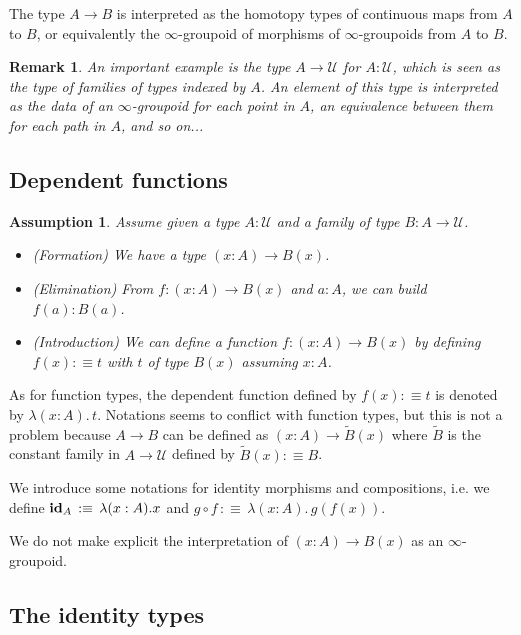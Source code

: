 \documentclass{article}
\newcommand{\sse}[1]{\medbreak \subsection{#1}}
\newcommand{\U}{{\mathcal U}}
\renewcommand{\r}{\rightarrow}
\newcommand{\Gl}{\lambda}
\newcommand{\id}{\mathrm{\bf id}}
\newtheorem{remark}{Remark}
\newtheorem{assumption}{Assumption}
\begin{document}
The type $A\r B$ is interpreted as the homotopy types of continuous maps from $A$ to $B$, or equivalently the $\infty$-groupoid of morphisms of $\infty$-groupoids from $A$ to $B$.

\begin{remark}
An important example is the type $A\r \U$ for $A:\U$, which is seen as the type of families of types indexed by $A$. An element of this type is interpreted as the data of an $\infty$-groupoid for each point in $A$, an equivalence between them for each path in $A$, and so on...
\end{remark}


\sse{Dependent functions}

\begin{assumption}
Assume given a type $A:\U$ and a family of type $B:A\r\U$.
\begin{itemize}
\item (Formation) We have a type $(x:A)\r B(x)$.
\item (Elimination) From $f:(x:A)\r B(x)$ and $a:A$, we can build $f(a):B(a)$.
\item (Introduction) We can define a function $f:(x:A)\r B(x)$ by defining $f(x):\equiv t$ with $t$ of type $B(x)$ assuming $x:A$.
\end{itemize}
\end{assumption}


As for function types, the dependent function defined by $f(x):\equiv t$ is denoted by $\Gl (x:A).\, t$. Notations seems to conflict with function types, but this is not a problem because $A\r B$ can be defined as $(x:A)\r \tilde{B}(x)$ where $\tilde{B}$ is the constant family in $A\r \U$ defined by $\tilde{B}(x) :\equiv B$. %

We introduce some notations for identity morphisms and compositions, i.e. %
we define $\id_A \, :\equiv\, \Gl(x:A).x$ and $g\circ f\, :\equiv\, \Gl(x:A).\, g(f(x))$.

We do not make explicit the interpretation of $(x:A)\r B(x)$ as an $\infty$-groupoid.



\sse{The identity types}
\end{document}
